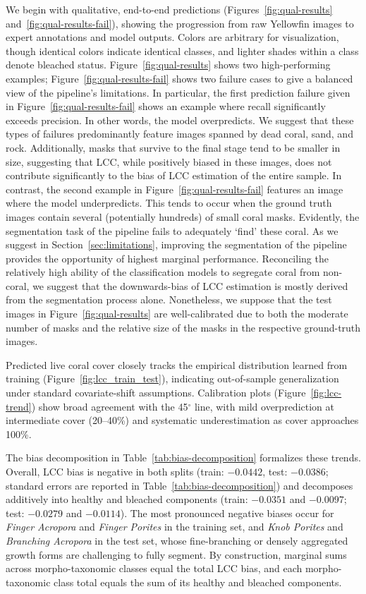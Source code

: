 \documentclass[11pt]{elsarticle}
\begin{document}
We begin with qualitative, end-to-end predictions (Figures~\ref{fig:qual-results} and~\ref{fig:qual-results-fail}), showing the progression from raw Yellowfin images to expert annotations and model outputs. Colors are arbitrary for visualization, though identical colors indicate identical classes, and lighter shades within a class denote bleached status.
Figure~\ref{fig:qual-results} shows two high-performing examples; Figure~\ref{fig:qual-results-fail} shows two failure cases to give a balanced view of the pipeline's limitations.
In particular, the first prediction failure given in Figure~\ref{fig:qual-results-fail} shows an example where recall significantly exceeds precision. In other words, the model overpredicts. We suggest that these types of failures predominantly feature images spanned by dead coral, sand, and rock. Additionally, masks that survive to the final stage tend to be smaller in size, suggesting that LCC, while positively biased in these images, does not contribute significantly to the bias of LCC estimation of the entire sample.
In contrast, the second example in Figure~\ref{fig:qual-results-fail} features an image where the model underpredicts. This tends to occur when the ground truth images contain several (potentially hundreds) of small coral masks. Evidently, the segmentation task of the pipeline fails to adequately `find' these coral. As we suggest in Section~\ref{sec:limitations}, improving the segmentation of the pipeline provides the opportunity of highest marginal performance. Reconciling the relatively high ability of the classification models to
segregate coral from non-coral, we suggest that the downwards-bias of LCC estimation is mostly derived from the segmentation process alone.
Nonetheless, we suppose that the test images in Figure~\ref{fig:qual-results} are well-calibrated due to both the moderate number of masks and the relative size of the masks in the respective ground-truth images.



Predicted live coral cover closely tracks the empirical distribution learned from training (Figure~\ref{fig:lcc_train_test}), indicating out-of-sample generalization under standard covariate-shift assumptions. Calibration plots (Figure~\ref{fig:lcc-trend}) show broad agreement with the 45$^\circ$ line, with mild overprediction at intermediate cover (20--40\%) and systematic underestimation as cover approaches 100\%.

The bias decomposition in Table~\ref{tab:bias-decomposition} formalizes these trends. Overall, LCC bias is negative in both splits (train: $-0.0442$, test: $-0.0386$; standard errors are reported in Table~\ref{tab:bias-decomposition}) and decomposes additively into healthy and bleached components (train: $-0.0351$ and $-0.0097$; test: $-0.0279$ and $-0.0114$). The most pronounced negative biases occur for \emph{Finger Acropora} and \emph{Finger Porites} in the training set, and \emph{Knob Porites} and \emph{Branching Acropora} in the test set, whose fine-branching or densely aggregated growth forms are challenging to fully segment. By construction, marginal sums across morpho-taxonomic classes equal the total LCC bias, and each morpho-taxonomic class total equals the sum of its healthy and bleached components.
\end{document}
